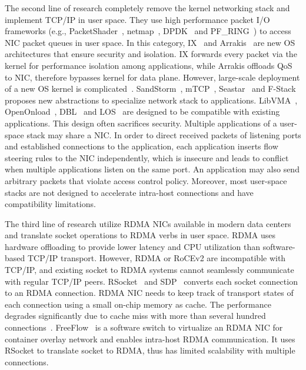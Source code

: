 The second line of research completely remove the kernel networking stack and implement TCP/IP in user space.
They use high performance packet I/O frameworks (e.g., PacketShader~\cite{han2010packetshader}, netmap~\cite{rizzo2012netmap},  DPDK~\cite{dpdk} and PF\_RING~\cite{pf-ring}) to access NIC packet queues in user space.
In this category, IX~\cite{belay2017ix} and Arrakis~\cite{peter2016arrakis} are new OS architectures that ensure security and isolation.
IX forwards every packet via the kernel for performance isolation among applications, while Arrakis offloads QoS to NIC, therefore bypasses kernel for data plane.
However, large-scale deployment of a new OS kernel is complicated~\cite{andromeda}.
SandStorm~\cite{marinos2014network}, mTCP~\cite{jeong2014mtcp}, Seastar~\cite{seastar} and F-Stack~\cite{fstack} proposes new abstractions to specialize network stack to applications.
LibVMA~\cite{libvma}, OpenOnload~\cite{openonload}, DBL~\cite{dbl} and LOS~\cite{huang2017high} are designed to be compatible with existing applications.
This design often sacrifices security. Multiple applications of a user-space stack may share a NIC.
In order to direct received packets of listening ports and established connections to the application, 
each application inserts flow steering rules to the NIC independently, which is insecure and leads to conflict when multiple applications listen on the same port.
An application may also send arbitrary packets that violate access control policy.
Moreover, most user-space stacks are not designed to accelerate intra-host connections and have compatibility limitations.

The third line of research utilize RDMA NICs available in modern data centers~\cite{guo2016rdma} and translate socket operations to RDMA verbs in user space.
RDMA uses hardware offloading to provide lower latency and CPU utilization than software-based TCP/IP transport.
However, RDMA or RoCEv2 are incompatible with TCP/IP, and existing socket to RDMA systems cannot seamlessly communicate with regular TCP/IP peers.
RSocket~\cite{rsockets} and SDP~\cite{socketsdirect} converts each socket connection to an RDMA connection.
RDMA NIC needs to keep track of transport states of each connection using a small on-chip memory as cache.
The performance degrades significantly due to cache miss with more than several hundred connections~\cite{mprdma,kaminsky2016design}.
FreeFlow~\cite{freeflow} is a software switch to virtualize an RDMA NIC for container overlay network and enables intra-host RDMA communication.
It uses RSocket to translate socket to RDMA, thus has limited scalability with multiple connections.

